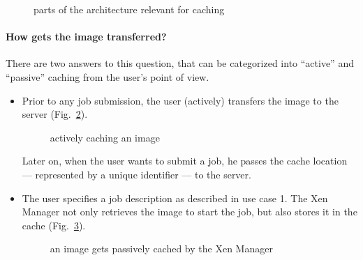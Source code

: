 \begin{figure}[htbp]
  \begin{center}
  \end{center}
  \caption[Architecture UC 2]{parts of the architecture relevant for caching}
  \label{fig:arch-uc-caching}
\end{figure}

\paragraph{How gets the image transferred?} There are two answers to this
question, that can be  categorized into ``active'' and ``passive'' caching
from the user's point of view.
\begin{itemize}
\item Prior to any job submission, the user (actively) transfers the image
  to the server  (Fig.~\ref{fig:seq-image-caching-1}).
  \begin{figure}[htbp]
    \begin{center}
    \end{center}
    \caption[Image caching sequence 1]{actively caching an image}
    \label{fig:seq-image-caching-1}
  \end{figure}
  Later  on, when the  user wants  to submit  a job,  he passes  the cache
  location --- represented by a unique identifier --- to the server.
  
\item The user specifies a job description as described in use case 1. The
  Xen Manager  not only  retrieves the  image to start  the job,  but also
  stores it in the cache (Fig.~\ref{fig:seq-image-caching-2}).
  \begin{figure}[htbp]
    \begin{center}
    \end{center}
    \caption[Image caching sequence 2]{an image gets passively cached by
      the Xen Manager}
    \label{fig:seq-image-caching-2}
  \end{figure}
\end{itemize}


